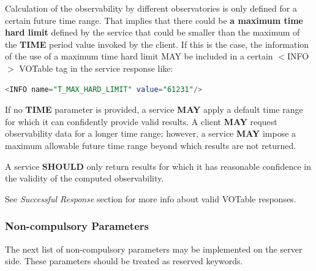 \documentclass[11pt,a4paper]{ivoatex/ivoa}
\begin{document}
\begin{itemize}
{Calculation of the observability by different observatories is only defined
for a certain future time range. That implies that there could be
\textbf{a maximum time hard limit} defined by the service that could be
smaller than the maximum of the \textbf{TIME} period value invoked by
the client. If this is the case, the information of the use of a maximum
time hard limit MAY be included in a certain $<$INFO$>$ VOTable tag in 
the service response like:
\begin{lstlisting}[language=SQL]
<INFO name="T_MAX_HARD_LIMIT" value="61231"/>
\end{lstlisting}
}
\end{itemize}

If no \textbf{TIME} parameter is provided, a service \textbf{MAY} apply a default
time range for which it can confidently provide valid results.
A client \textbf{MAY} request observability data for a longer time range;
however, a service \textbf{MAY} impose a maximum allowable future time
range beyond which results are not returned.

A service \textbf{SHOULD} only return results for which it has reasonable
confidence in the validity of the computed observability.

See \textit{Successful Response} section for more info about valid
VOTable res\-pon\-ses.

\subsubsection{Non-compulsory Parameters}
The next list of non-compulsory parameters may be implemented on the
server side. These parameters should be treated as reserved keywords.
\end{document}
